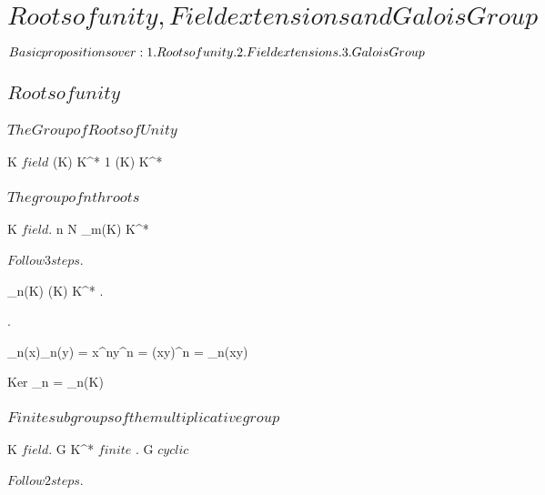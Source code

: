 \documentclass[a5paper]{book}
\begin{document}
\chapter{ $ Roots of unity, Field extensions and Galois Group $ }

\introduction
{
	$
	Basic propositions over:\\
	1. Roots of unity. \\
	2. Field extensions. \\
	3. Galois Group
	$
}


\section{ $ Roots of unity $ }
{
	
	\subsection{ $ The Group of Roots of Unity $ }
	
	{
		K $ field $
	}
	\proposition
	{
		\mu(K) \substructure K^*
	}
	\demonstration
	{
		{
			1
		}
		\mu(K) \substructure K^*
	}
	\newpage



	\subsection{ $ The group of nth roots $ }
	
	{
		K $ field $.
		n \in N
	}
	\proposition
	{
		\mu_m(K) \normal K^*
	}
	\demonstration
	{
		$ Follow 3 steps $.
		
		{
			\mu_n(K) \subset \mu(K) \subset K^*
		}.

		{
			.

			{
				\phi_n(x)\phi_n(y) = x^ny^n = (xy)^n = \phi_n(xy)
			}
		}
		
		{
			Ker \phi_n = \mu_n(K)
		}
		
	}
	\newpage


	\subsection{ $ Finite subgroups of the multiplicative group $ }
	
	{
		K $ field $.
		G \substructure K^* $ finite $
	}
	\proposition
	{
		.
		G $ cyclic $
	}
	\demonstration
	{
		$ Follow 2 steps $.
		
}}
\end{document}
